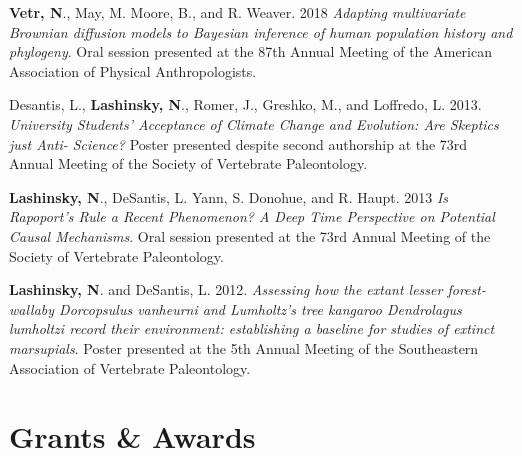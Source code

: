 \documentclass[12pt]{article}
\begin{document}
\begin{enumerate}[label={[\arabic*]}]

\item \textbf{Vetr, N}., May, M. Moore, B., and R. Weaver. 2018 \emph{Adapting multivariate Brownian diffusion models to Bayesian inference of human population history and phylogeny}. Oral session presented at the 87th Annual Meeting of the American Association of Physical Anthropologists.

\item Desantis, L., \textbf{Lashinsky, N}., Romer, J., Greshko, M., and Loffredo, L. 2013. \emph{University Students' Acceptance of Climate Change and Evolution: Are Skeptics just Anti- Science?} Poster presented despite second authorship at the 73rd Annual Meeting of the Society of Vertebrate Paleontology. 

\item \textbf{Lashinsky, N}., DeSantis, L. Yann, S. Donohue, and R. Haupt. 2013 \emph{Is Rapoport’s Rule a Recent Phenomenon? A Deep Time Perspective on Potential Causal Mechanisms}. Oral session presented at the 73rd Annual Meeting of the Society of Vertebrate Paleontology. 

\item \textbf{Lashinsky, N}. and DeSantis, L. 2012. \emph{Assessing how the extant lesser forest-wallaby Dorcopsulus vanheurni and Lumholtz’s tree kangaroo Dendrolagus lumholtzi record their environment: establishing a baseline for studies of extinct marsupials}. Poster presented at the 5th Annual Meeting of the Southeastern Association of Vertebrate Paleontology. 


\end{enumerate}

\vspace{-0.35em}
\section{Grants \& Awards}
\end{document}

